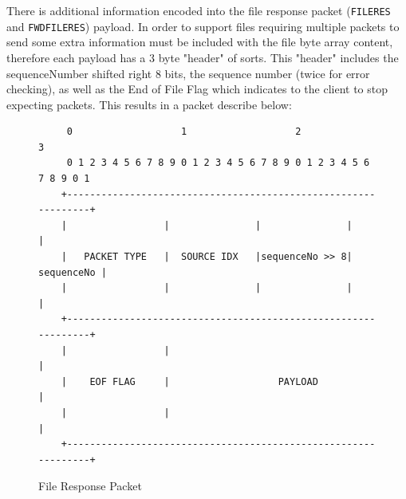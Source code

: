 \documentclass{article}
\newcommand{\code}[1]{\texttt{#1}}
\begin{document}
There is additional information encoded into the file response packet (\code{FILERES} and \code{FWDFILERES}) payload. 
In order to support files requiring multiple packets to send some extra information must be included with the file byte array content, therefore each payload has a 3 byte "header" of sorts. This "header" includes the sequenceNumber shifted right 8 bits, the sequence number (twice for error checking), as well as the End of File Flag which indicates to the client to stop expecting packets. This results in a packet describe below:
\begin{figure}[!ht]
	\centering
	\begin{BVerbatim}
	 0                   1                   2                   3  
	 0 1 2 3 4 5 6 7 8 9 0 1 2 3 4 5 6 7 8 9 0 1 2 3 4 5 6 7 8 9 0 1
	+---------------------------------------------------------------+
	|                 |               |               |             |
	|   PACKET TYPE   |  SOURCE IDX   |sequenceNo >> 8|  sequenceNo |
	|                 |               |               |             |
	+---------------------------------------------------------------+
	|                 |                                             |
	|    EOF FLAG     |                   PAYLOAD                   |
	|                 |                                             |
	+---------------------------------------------------------------+
	\end{BVerbatim}
	\caption{File Response Packet}
\end{figure}
\end{document}

